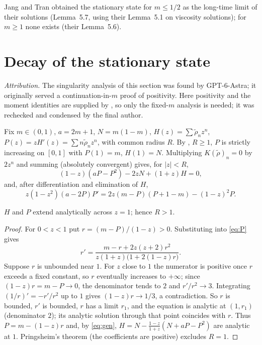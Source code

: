 \documentclass[11pt,a4paper]{report}
\newcommand{\rtil}{\tilde\rho}
\begin{document}
Jang and Tran obtained the stationary state for \(m\le1/2\) as the long-time limit of their solutions
(Lemma~5.7, using their Lemma~5.1 on viscosity solutions); for \(m\ge1\) none exists (their Lemma~5.6).

\section{Decay of the stationary state}\label{sec:asymptotics}

\emph{Attribution.} The singularity analysis of this section was found by GPT-6-Astra; it originally served a
continuation-in-\(m\) proof of positivity. Here positivity and the moment identities are supplied by
, so only the fixed-\(m\) analysis is needed; it was rechecked and condensed by the
final author.

Fix \(m\in(0,1)\), \(a=2m+1\), \(N=m(1-m)\), \(H(z)=\sum\rtil_nz^n\), \(P(z)=zH'(z)=\sum n\rtil_nz^n\), with common
radius \(R\). By , \(R\ge1\), \(P\) is strictly increasing on \([0,1]\) with
\(P(1)=m\), \(H(1)=N\). Multiplying \(K(\rtil)_n=0\) by \(2z^n\) and summing (absolutely convergent) gives, for
\(|z|<R\),
\begin{equation}\label{eq:gen}
(1-z)(aP-P^2)-2zN+(1+z)H=0,
\end{equation}
and, after differentiation and elimination of \(H\),
\begin{equation}\label{eq:P}
z(1-z^2)(a-2P)P'=2z(m-P)(P+1-m)-(1-z)^2P .
\end{equation}

\begin{lemma}\label{lem:one}
\(H\) and \(P\) extend analytically across \(z=1\); hence \(R>1\).
\end{lemma}
\begin{proof}
For \(0<z<1\) put \(r=(m-P)/(1-z)>0\). Substituting into \eqref{eq:P} gives
\[
r'=\frac{m-r+2z(z+2)r^2}{z(1+z)\bigl(1+2(1-z)r\bigr)} .
\]
Suppose \(r\) is unbounded near \(1\). For \(z\) close to \(1\) the numerator is positive once \(r\) exceeds a
fixed constant, so \(r\) eventually increases to \(+\infty\); since \((1-z)r=m-P\to0\), the denominator tends
to \(2\) and \(r'/r^2\to3\). Integrating \((1/r)'=-r'/r^2\) up to \(1\) gives \((1-z)r\to1/3\), a contradiction.
So \(r\) is bounded, \(r'\) is bounded, \(r\) has a limit \(r_1\), and the equation is analytic at
\((1,r_1)\) (denominator \(2\)); its analytic solution through that point coincides with \(r\). Thus
\(P=m-(1-z)r\) and, by \eqref{eq:gen}, \(H=N-\frac{1-z}{1+z}(N+aP-P^2)\) are analytic at \(1\). Pringsheim's
theorem \autocite[Theorem IV.6]{FlajoletSedgewick2009} (the coefficients are positive) excludes \(R=1\).
\end{proof}
\end{document}
